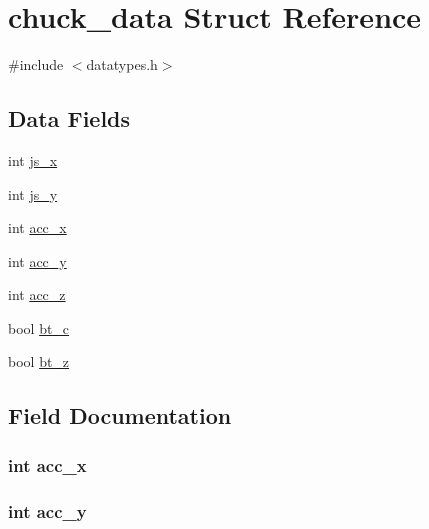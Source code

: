 \hypertarget{structchuck__data}{}\section{chuck\+\_\+data Struct Reference}
\label{structchuck__data}


{\ttfamily \#include $<$datatypes.\+h$>$}

\subsection*{Data Fields}
\begin{DoxyCompactItemize}
\item 
int \hyperlink{structchuck__data_a255b264700051e2ac0f9068b70da861f}{js\+\_\+x}
\item 
int \hyperlink{structchuck__data_a7333b2e1634c12d6f5d169b7bfd6e023}{js\+\_\+y}
\item 
int \hyperlink{structchuck__data_a8dfa674542ec2c7aa5597db3e304fb52}{acc\+\_\+x}
\item 
int \hyperlink{structchuck__data_aacfcc09e5c32e59e920dad5d51925972}{acc\+\_\+y}
\item 
int \hyperlink{structchuck__data_a839127c95042324c621c2460cc87d508}{acc\+\_\+z}
\item 
bool \hyperlink{structchuck__data_acd68d783e852df0a016dcafb44402f86}{bt\+\_\+c}
\item 
bool \hyperlink{structchuck__data_a33ceb865cadc673b73d6c1ac14ab39e5}{bt\+\_\+z}
\end{DoxyCompactItemize}


\subsection{Field Documentation}
\hypertarget{structchuck__data_a8dfa674542ec2c7aa5597db3e304fb52}{}
\subsubsection[{acc\+\_\+x}]{\setlength{\rightskip}{0pt plus 5cm}int acc\+\_\+x}\label{structchuck__data_a8dfa674542ec2c7aa5597db3e304fb52}
\hypertarget{structchuck__data_aacfcc09e5c32e59e920dad5d51925972}{}
\subsubsection[{acc\+\_\+y}]{\setlength{\rightskip}{0pt plus 5cm}int acc\+\_\+y}\label{structchuck__data_aacfcc09e5c32e59e920dad5d51925972}
\hypertarget{structchuck__data_a839127c95042324c621c2460cc87d508}{}
